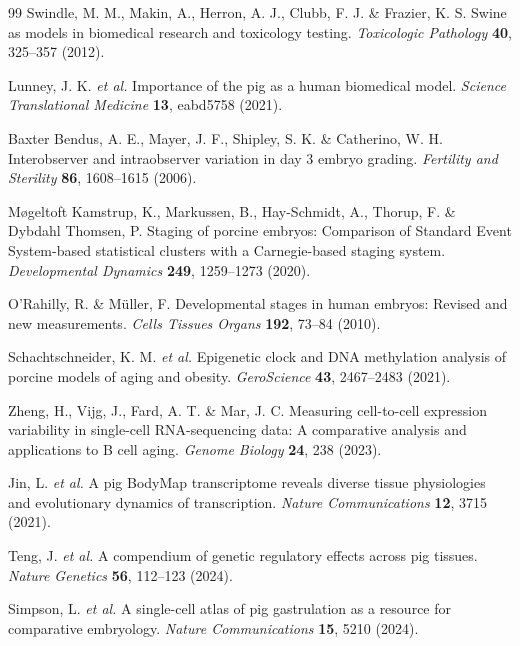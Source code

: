 \begin{thebibliography}{99}
 Swindle, M. M., Makin, A., Herron, A. J., Clubb, F. J. \& Frazier, K. S. Swine as models in biomedical research and toxicology testing. \textit{Toxicologic Pathology} \textbf{40}, 325--357 (2012).

 Lunney, J. K. \textit{et al.} Importance of the pig as a human biomedical model. \textit{Science Translational Medicine} \textbf{13}, eabd5758 (2021).

 Baxter Bendus, A. E., Mayer, J. F., Shipley, S. K. \& Catherino, W. H. Interobserver and intraobserver variation in day 3 embryo grading. \textit{Fertility and Sterility} \textbf{86}, 1608--1615 (2006).

 M{\o}geltoft Kamstrup, K., Markussen, B., Hay-Schmidt, A., Thorup, F. \& Dybdahl Thomsen, P. Staging of porcine embryos: Comparison of Standard Event System-based statistical clusters with a Carnegie-based staging system. \textit{Developmental Dynamics} \textbf{249}, 1259--1273 (2020).

 O'Rahilly, R. \& M{\"u}ller, F. Developmental stages in human embryos: Revised and new measurements. \textit{Cells Tissues Organs} \textbf{192}, 73--84 (2010).

 Schachtschneider, K. M. \textit{et al.} Epigenetic clock and DNA methylation analysis of porcine models of aging and obesity. \textit{GeroScience} \textbf{43}, 2467--2483 (2021).

 Zheng, H., Vijg, J., Fard, A. T. \& Mar, J. C. Measuring cell-to-cell expression variability in single-cell RNA-sequencing data: A comparative analysis and applications to B cell aging. \textit{Genome Biology} \textbf{24}, 238 (2023).

 Jin, L. \textit{et al.} A pig BodyMap transcriptome reveals diverse tissue physiologies and evolutionary dynamics of transcription. \textit{Nature Communications} \textbf{12}, 3715 (2021).

 Teng, J. \textit{et al.} A compendium of genetic regulatory effects across pig tissues. \textit{Nature Genetics} \textbf{56}, 112--123 (2024).

 Simpson, L. \textit{et al.} A single-cell atlas of pig gastrulation as a resource for comparative embryology. \textit{Nature Communications} \textbf{15}, 5210 (2024).


\end{thebibliography}
